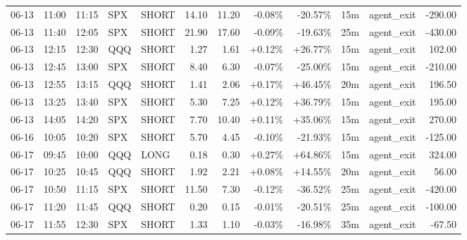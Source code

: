 \documentclass[11pt,a4paper]{article}
\begin{document}
\begin{center}
\begin{longtable}{>{\color{txtmain}}l l l l l r r r r r >{\color{txtmain}}l r}
06-13 & 11:00 & 11:15 & SPX & SHORT & 14.10 & 11.20 & \textcolor{lossred}{-0.08\%} & \textcolor{lossred}{-20.57\%} & 15m & agent\_exit & \textcolor{lossred}{-290.00} \\
06-13 & 11:40 & 12:05 & SPX & SHORT & 21.90 & 17.60 & \textcolor{lossred}{-0.09\%} & \textcolor{lossred}{-19.63\%} & 25m & agent\_exit & \textcolor{lossred}{-430.00} \\
06-13 & 12:15 & 12:30 & QQQ & SHORT & 1.27 & 1.61 & \textcolor{wingreen}{+0.12\%} & \textcolor{wingreen}{+26.77\%} & 15m & agent\_exit & \textcolor{wingreen}{102.00} \\
06-13 & 12:45 & 13:00 & SPX & SHORT & 8.40 & 6.30 & \textcolor{lossred}{-0.07\%} & \textcolor{lossred}{-25.00\%} & 15m & agent\_exit & \textcolor{lossred}{-210.00} \\
06-13 & 12:55 & 13:15 & QQQ & SHORT & 1.41 & 2.06 & \textcolor{wingreen}{+0.17\%} & \textcolor{wingreen}{+46.45\%} & 20m & agent\_exit & \textcolor{wingreen}{196.50} \\
06-13 & 13:25 & 13:40 & SPX & SHORT & 5.30 & 7.25 & \textcolor{wingreen}{+0.12\%} & \textcolor{wingreen}{+36.79\%} & 15m & agent\_exit & \textcolor{wingreen}{195.00} \\
06-13 & 14:05 & 14:20 & SPX & SHORT & 7.70 & 10.40 & \textcolor{wingreen}{+0.11\%} & \textcolor{wingreen}{+35.06\%} & 15m & agent\_exit & \textcolor{wingreen}{270.00} \\
06-16 & 10:05 & 10:20 & SPX & SHORT & 5.70 & 4.45 & \textcolor{lossred}{-0.10\%} & \textcolor{lossred}{-21.93\%} & 15m & agent\_exit & \textcolor{lossred}{-125.00} \\
06-17 & 09:45 & 10:00 & QQQ & LONG & 0.18 & 0.30 & \textcolor{wingreen}{+0.27\%} & \textcolor{wingreen}{+64.86\%} & 15m & agent\_exit & \textcolor{wingreen}{324.00} \\
06-17 & 10:25 & 10:45 & QQQ & SHORT & 1.92 & 2.21 & \textcolor{wingreen}{+0.08\%} & \textcolor{wingreen}{+14.55\%} & 20m & agent\_exit & \textcolor{wingreen}{56.00} \\
06-17 & 10:50 & 11:15 & SPX & SHORT & 11.50 & 7.30 & \textcolor{lossred}{-0.12\%} & \textcolor{lossred}{-36.52\%} & 25m & agent\_exit & \textcolor{lossred}{-420.00} \\
06-17 & 11:20 & 11:45 & QQQ & SHORT & 0.20 & 0.15 & \textcolor{lossred}{-0.01\%} & \textcolor{lossred}{-20.51\%} & 25m & agent\_exit & \textcolor{lossred}{-100.00} \\
06-17 & 11:55 & 12:30 & SPX & SHORT & 1.33 & 1.10 & \textcolor{lossred}{-0.03\%} & \textcolor{lossred}{-16.98\%} & 35m & agent\_exit & \textcolor{lossred}{-67.50} \\

\end{longtable}
\end{center}
\end{document}
